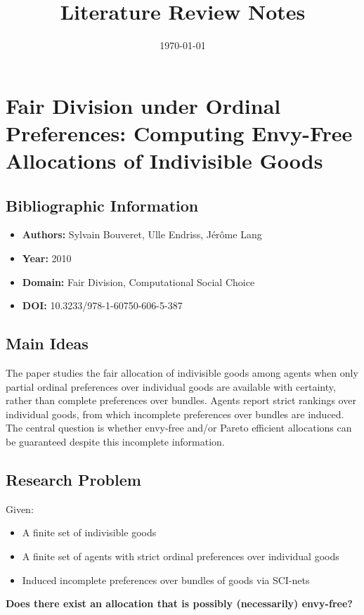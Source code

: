 \documentclass[12pt,a4paper]{article}
\title{Literature Review Notes}
\author{}
\date{\today}
\begin{document}
\maketitle
\tableofcontents
\newpage

\section{Fair Division under Ordinal Preferences: Computing Envy-Free Allocations of Indivisible Goods}
\label{sec:article1}

\subsection*{Bibliographic Information}
\begin{itemize}
    \item \textbf{Authors:} Sylvain Bouveret, Ulle Endriss, Jérôme Lang
    \item \textbf{Year:} 2010
    \item \textbf{Domain:} Fair Division, Computational Social Choice
    \item \textbf{DOI:} 10.3233/978-1-60750-606-5-387
\end{itemize}

\subsection*{Main Ideas}
\begin{tcolorbox}[colback=blue!5!white, colframe=blue!50!black]
The paper studies the fair allocation of indivisible goods among agents when only partial ordinal preferences over individual goods are available with certainty, rather than complete preferences over bundles.
Agents report strict rankings over individual goods, from which incomplete preferences over bundles are induced. The central question is whether envy-free and/or Pareto efficient allocations can be guaranteed despite this incomplete information.
\end{tcolorbox}

\subsection*{Research Problem}
Given:
\begin{itemize}
    \item A finite set of indivisible goods
    \item A finite set of agents with strict ordinal preferences over individual goods
    \item Induced incomplete preferences over bundles of goods via SCI-nets
\end{itemize}
\textbf{Does there exist an allocation that is possibly (necessarily) envy-free?}
\end{document}
